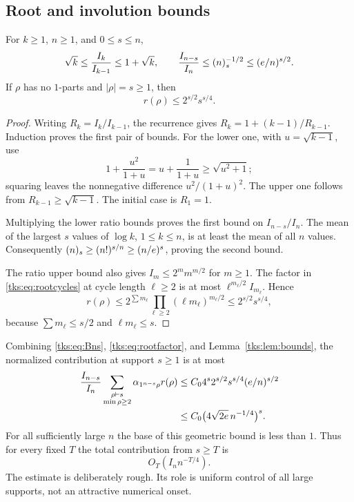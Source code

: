 \subsection{Root and involution bounds}
\begin{lemma}\label{tks:lem:bounds}
For $k\geq1$, $n\geq1$, and $0\leq s\leq n$,
\begin{equation}\label{tks:eq:ratbound}
\sqrt k\leq\frac{I_k}{I_{k-1}}\leq1+\sqrt k,
\qquad
\frac{I_{n-s}}{I_n}\leq(n)_{s}^{-1/2}\leq(e/n)^{s/2}.
\end{equation}
If $\rho$ has no $1$-parts and $|\rho|=s\geq1$, then
\begin{equation}\label{tks:eq:rootbound}
r(\rho)\leq2^{s/2}s^{s/4}.
\end{equation}
\end{lemma}
\begin{proof}
Writing $R_k=I_k/I_{k-1}$, the recurrence gives $R_k=1+(k-1)/R_{k-1}$. Induction proves the first pair of bounds. For the lower one, with $u=\sqrt{k-1}$, use
\[
1+\frac{u^2}{1+u}=u+\frac1{1+u}\geq\sqrt{u^2+1};
\]
squaring leaves the nonnegative difference $u^2/(1+u)^2$. The upper one follows from $R_{k-1}\geq\sqrt{k-1}$. The initial case is $R_1=1$.

Multiplying the lower ratio bounds proves the first bound on $I_{n-s}/I_n$. The mean of the largest $s$ values of $\log k$, $1\leq k\leq n$, is at least the mean of all $n$ values. Consequently
$(n)_{s}\geq(n!)^{s/n}\geq(n/e)^s$, proving the second bound.

The ratio upper bound also gives $I_m\leq2^m m^{m/2}$ for $m\geq1$. The factor in \eqref{tks:eq:rootcycles} at cycle length $\ell\geq2$ is at most $\ell^{m_\ell/2}I_{m_\ell}$. Hence
\[
r(\rho)\leq2^{\sum m_\ell}\prod_{\ell\geq2}(\ell m_\ell)^{m_\ell/2}
\leq2^{s/2}s^{s/4},
\]
because $\sum m_\ell\leq s/2$ and $\ell m_\ell\leq s$.
\end{proof}

Combining \eqref{tks:eq:Bns}, \eqref{tks:eq:rootfactor}, and Lemma~\ref{tks:lem:bounds}, the normalized contribution at support $s\geq1$ is at most
\begin{align}
\frac{I_{n-s}}{I_n}
 \sum_{\substack{\rho\vdash s\\\min\rho\geq2}}
       \alpha_{1^{n-s}\rho}r(\rho)
&\leq C_0 4^s 2^{s/2}s^{s/4}(e/n)^{s/2}\notag\\
&\leq C_0\bigl(4\sqrt{2e}\,n^{-1/4}\bigr)^s.\label{tks:eq:globaltail}
\end{align}
For all sufficiently large $n$ the base of this geometric bound is less than $1$. Thus for every fixed $T$ the total contribution from $s\geq T$ is
\begin{equation}\label{tks:eq:tailT}
O_T(I_n n^{-T/4}).
\end{equation}
The estimate is deliberately rough. Its role is uniform control of all large supports, not an attractive numerical onset.

